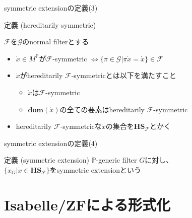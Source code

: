 \documentclass[17pt,aspectratio=169]{beamer}
\newcommand{\Pbb}{\mathbb{P}}
\newcommand{\Gcal}{\mathcal{G}}
\newcommand{\Fcal}{\mathcal{F}}
\begin{document}
\begin{frame}{symmetric extensionの定義(3)}
    \begin{itembox}[l]{定義 (hereditarily symmetric)}
        {\small
            $\Fcal$を$\Gcal$のnormal filterとする
            \vspace{5pt}
            \begin{itemize}
                \setlength{\itemsep}{2pt}
                \vspace{-10pt}
                \item $\dot{x} \in M^\Pbb$が$\Fcal$-symmetric $\Leftrightarrow \{ \pi \in \Gcal | \pi \dot{x} = \dot{x} \} \in \Fcal$
                \item $\dot{x}$がhereditarily $\Fcal$-symmetricとは以下を満たすこと
                      \vspace{-3pt}
                      \begin{itemize}
                          \item $\dot{x}$は$\Fcal$-symmetric
                          \item $\bm{\mathbf{dom}}(\dot{x})$の全ての要素はhereditarily $\Fcal$-symmetric
                      \end{itemize}
                \item hereditarily $\Fcal$-symmetricな$\dot{x}$の集合を$\bm{\mathbf{HS}}_{\Fcal}$とかく
            \end{itemize}
        }
    \end{itembox}
\end{frame}

\begin{frame}{symmetric extensionの定義(4)}
    \begin{itembox}[l]{定義 (symmetric extension)}
        {\small
            $\Pbb$-generic filter $G$に対し、\\$\{ \dot{x}_G | \dot{x} \in \bm{\mathbf{HS}}_{\Fcal} \}$をsymmetric extensionという
        }
    \end{itembox}
\end{frame}

\section {Isabelle/ZFによる形式化}
\end{document}
